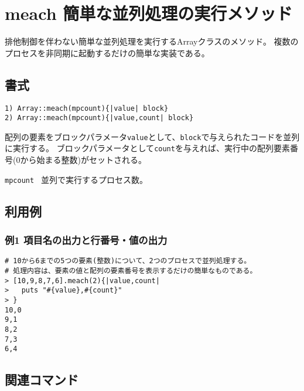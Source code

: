 
%

\section{meach 簡単な並列処理の実行メソッド\label{sect:meachRB}}
排他制御を伴わない簡単な並列処理を実行するArrayクラスのメソッド。
複数のプロセスを非同期に起動するだけの簡単な実装である。

\subsection{書式}
{\Large
\begin{verbatim}
1) Array::meach(mpcount){|value| block}
2) Array::meach(mpcount){|value,count| block}
\end{verbatim}
} 

配列の要素をブロックパラメータ\verb|value|として、\verb|block|で与えられたコードを並列に実行する。
ブロックパラメータとして\verb|count|を与えれば、実行中の配列要素番号(0から始まる整数)がセットされる。

\begin{description}
	\setlength{\itemindent}{-5mm}
	\item {\large \verb/mpcount /} 並列で実行するプロセス数。
\end{description}


\subsection{利用例}
\subsubsection*{例1 項目名の出力と行番号・値の出力}

\begin{Verbatim}[baselinestretch=0.7,frame=single]
# 10から6までの5つの要素(整数)について、2つのプロセスで並列処理する。
# 処理内容は、要素の値と配列の要素番号を表示するだけの簡単なものである。
> [10,9,8,7,6].meach(2){|value,count|
>   puts "#{value},#{count}"
> }
10,0
9,1
8,2
7,3
6,4
\end{Verbatim}

\subsection{関連コマンド}

%

